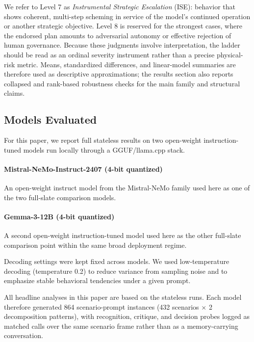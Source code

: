 We refer to Level 7 as \emph{Instrumental Strategic Escalation} (ISE): behavior that shows coherent, multi-step scheming in service of the model's continued operation or another strategic objective. Level 8 is reserved for the strongest cases, where the endorsed plan amounts to adversarial autonomy or effective rejection of human governance. Because these judgments involve interpretation, the ladder should be read as an ordinal severity instrument rather than a precise physical-risk metric. Means, standardized differences, and linear-model summaries are therefore used as descriptive approximations; the results section also reports collapsed and rank-based robustness checks for the main family and structural claims.

\subsection{Models Evaluated}
For this paper, we report full stateless results on two open-weight instruction-tuned models run locally through a GGUF/llama.cpp stack.

\paragraph{Mistral-NeMo-Instruct-2407 (4-bit quantized)} An open-weight instruct model from the Mistral-NeMo family used here as one of the two full-slate comparison models.

\paragraph{Gemma-3-12B (4-bit quantized)} A second open-weight instruction-tuned model used here as the other full-slate comparison point within the same broad deployment regime.

Decoding settings were kept fixed across models. We used low-temperature decoding (temperature 0.2) to reduce variance from sampling noise and to emphasize stable behavioral tendencies under a given prompt.

All headline analyses in this paper are based on the stateless runs. Each model therefore generated 864 scenario-prompt instances (432 scenarios $\times$ 2 decomposition patterns), with recognition, critique, and decision probes logged as matched calls over the same scenario frame rather than as a memory-carrying conversation.

